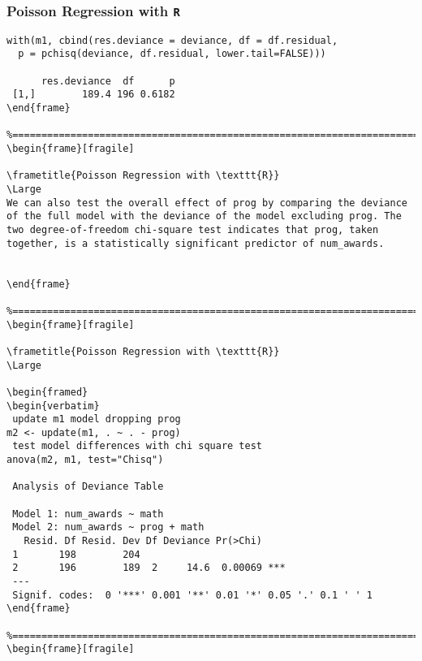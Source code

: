 \begin{frame}[fragile]

\frametitle{Poisson Regression with \texttt{R}}
\Large

\begin{framed}
\begin{verbatim}
with(m1, cbind(res.deviance = deviance, df = df.residual,
  p = pchisq(deviance, df.residual, lower.tail=FALSE)))
 
      res.deviance  df      p
 [1,]        189.4 196 0.6182
\end{frame}

%================================================================================================%
\begin{frame}[fragile]

\frametitle{Poisson Regression with \texttt{R}}
\Large 
We can also test the overall effect of prog by comparing the deviance of the full model with the deviance of the model excluding prog. The two degree-of-freedom chi-square test indicates that prog, taken together, is a statistically significant predictor of num_awards.
 

\end{frame}

%================================================================================================%
\begin{frame}[fragile]

\frametitle{Poisson Regression with \texttt{R}}
\Large

\begin{framed}
\begin{verbatim}
 update m1 model dropping prog
m2 <- update(m1, . ~ . - prog)
 test model differences with chi square test
anova(m2, m1, test="Chisq")
 
 Analysis of Deviance Table
 
 Model 1: num_awards ~ math
 Model 2: num_awards ~ prog + math
   Resid. Df Resid. Dev Df Deviance Pr(>Chi)    
 1       198        204                         
 2       196        189  2     14.6  0.00069 ***
 ---
 Signif. codes:  0 '***' 0.001 '**' 0.01 '*' 0.05 '.' 0.1 ' ' 1
\end{frame}

%================================================================================================%
\begin{frame}[fragile]


\end{verbatim}
\end{framed}
\end{frame}

